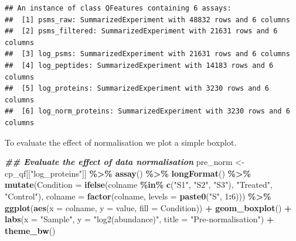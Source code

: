 \documentclass[9pt,a4paper,]{extarticle}
\newenvironment{Shaded}{\begin{snugshade}}{\end{snugshade}}
\newcommand{\AttributeTok}[1]{\textcolor[rgb]{0.13,0.29,0.53}{#1}}
\newcommand{\DecValTok}[1]{\textcolor[rgb]{0.00,0.00,0.81}{#1}}
\newcommand{\DocumentationTok}[1]{\textcolor[rgb]{0.56,0.35,0.01}{\textbf{\textit{#1}}}}
\newcommand{\FunctionTok}[1]{\textcolor[rgb]{0.13,0.29,0.53}{\textbf{#1}}}
\newcommand{\NormalTok}[1]{#1}
\newcommand{\OtherTok}[1]{\textcolor[rgb]{0.56,0.35,0.01}{#1}}
\newcommand{\SpecialCharTok}[1]{\textcolor[rgb]{0.81,0.36,0.00}{\textbf{#1}}}
\newcommand{\StringTok}[1]{\textcolor[rgb]{0.31,0.60,0.02}{#1}}
\begin{document}
\begin{verbatim}
## An instance of class QFeatures containing 6 assays:
##  [1] psms_raw: SummarizedExperiment with 48832 rows and 6 columns 
##  [2] psms_filtered: SummarizedExperiment with 21631 rows and 6 columns 
##  [3] log_psms: SummarizedExperiment with 21631 rows and 6 columns 
##  [4] log_peptides: SummarizedExperiment with 14183 rows and 6 columns 
##  [5] log_proteins: SummarizedExperiment with 3230 rows and 6 columns 
##  [6] log_norm_proteins: SummarizedExperiment with 3230 rows and 6 columns
\end{verbatim}

To evaluate the effect of normalisation we plot a simple boxplot.

\begin{Shaded}
\begin{Highlighting}[]
\DocumentationTok{\#\# Evaluate the effect of data normalisation}
\NormalTok{pre\_norm }\OtherTok{\textless{}{-}}\NormalTok{ cp\_qf[[}\StringTok{"log\_proteins"}\NormalTok{]] }\SpecialCharTok{\%\textgreater{}\%}
  \FunctionTok{assay}\NormalTok{() }\SpecialCharTok{\%\textgreater{}\%}
  \FunctionTok{longFormat}\NormalTok{() }\SpecialCharTok{\%\textgreater{}\%}
  \FunctionTok{mutate}\NormalTok{(}\AttributeTok{Condition =} \FunctionTok{ifelse}\NormalTok{(colname }\SpecialCharTok{\%in\%} \FunctionTok{c}\NormalTok{(}\StringTok{"S1"}\NormalTok{, }\StringTok{"S2"}\NormalTok{, }\StringTok{"S3"}\NormalTok{),}
                            \StringTok{"Treated"}\NormalTok{, }\StringTok{"Control"}\NormalTok{),}
         \AttributeTok{colname =} \FunctionTok{factor}\NormalTok{(colname, }\AttributeTok{levels =} \FunctionTok{paste0}\NormalTok{(}\StringTok{"S"}\NormalTok{, }\DecValTok{1}\SpecialCharTok{:}\DecValTok{6}\NormalTok{))) }\SpecialCharTok{\%\textgreater{}\%}
  \FunctionTok{ggplot}\NormalTok{(}\FunctionTok{aes}\NormalTok{(}\AttributeTok{x =}\NormalTok{ colname, }\AttributeTok{y =}\NormalTok{ value, }\AttributeTok{fill =}\NormalTok{ Condition)) }\SpecialCharTok{+}
  \FunctionTok{geom\_boxplot}\NormalTok{() }\SpecialCharTok{+}
  \FunctionTok{labs}\NormalTok{(}\AttributeTok{x =} \StringTok{"Sample"}\NormalTok{, }\AttributeTok{y =} \StringTok{"log2(abundance)"}\NormalTok{, }\AttributeTok{title =} \StringTok{"Pre{-}normalisation"}\NormalTok{) }\SpecialCharTok{+}
  \FunctionTok{theme\_bw}\NormalTok{()}


\end{Highlighting}
\end{Shaded}
\end{document}
